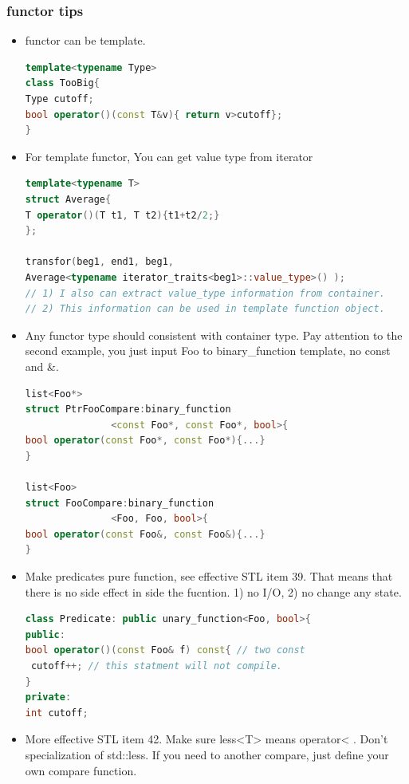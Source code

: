 \documentclass[a4paper,12pt,twoside]{book}
\begin{document}
\subsubsection{functor tips}

\begin{itemize}

\item functor can be template.
\begin{lstlisting}[frame=single, language=c++]
template<typename Type>
class TooBig{
Type cutoff;
bool operator()(const T&v){ return v>cutoff};
}
\end{lstlisting}

\item For template functor, You can get value type from iterator
\begin{lstlisting}[frame=single, language=c++]
template<typename T>
struct Average{
T operator()(T t1, T t2){t1+t2/2;}
};

transfor(beg1, end1, beg1,
Average<typename iterator_traits<beg1>::value_type>() );
// 1) I also can extract value_type information from container.
// 2) This information can be used in template function object.
\end{lstlisting}

\item Any functor type should consistent with container type. Pay attention to the second example, you just input Foo to binary\_function template, no const and \&.
\begin{lstlisting}[frame=single, language=c++]
list<Foo*>
struct PtrFooCompare:binary_function
               <const Foo*, const Foo*, bool>{
bool operator(const Foo*, const Foo*){...}
}

list<Foo>
struct FooCompare:binary_function
               <Foo, Foo, bool>{
bool operator(const Foo&, const Foo&){...}
}
\end{lstlisting}


\item Make predicates pure function, see effective STL item 39. That means that there is no side effect in side the fucntion. 1) no I/O, 2) no change any state.
\begin{lstlisting}[frame=single, language=c++]
class Predicate: public unary_function<Foo, bool>{
public:
bool operator()(const Foo& f) const{ // two const
 cutoff++; // this statment will not compile.
}
private:
int cutoff;
\end{lstlisting}


\item More effective STL item 42. Make sure less<T> means operator< . Don't specialization of std::less. If you need to another compare, just define your own compare function.


\end{itemize}
\end{document}
